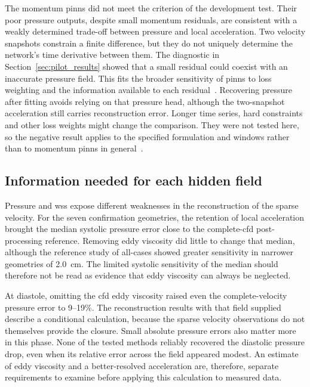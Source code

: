 \documentclass[12pt,a4paper]{article}
\newcommand{\CFD}{\ac{cfd}\xspace}
\newcommand{\PINNs}{\acp{pinn}\xspace}
\newcommand{\WSS}{\ac{wss}\xspace}
\theoremstyle{definition}
\numberwithin{equation}{section}
\begin{document}
The momentum \PINNs did not meet the criterion of the development test. Their poor pressure outputs, despite small momentum residuals, are consistent with a weakly determined trade-off between pressure and local acceleration. Two velocity snapshots constrain a finite difference, but they do not uniquely determine the network's time derivative between them. The diagnostic in Section~\ref{sec:pilot_results} showed that a small residual could coexist with an inaccurate pressure field. This fits the broader sensitivity of \PINNs to loss weighting and the information available to each residual~\cite{krishnapriyan2021failure,wang2021gradient}. Recovering pressure after fitting avoids relying on that pressure head, although the two-snapshot acceleration still carries reconstruction error. Longer time series, hard constraints and other loss weights might change the comparison. They were not tested here, so the negative result applies to the specified formulation and windows rather than to momentum \PINNs in general~\cite{mcgreivy2024weak}.

\subsection{Information needed for each hidden field}
Pressure and \WSS expose different weaknesses in the reconstruction of the sparse velocity. For the seven confirmation geometries, the retention of local acceleration brought the median systolic pressure error close to the complete-\CFD post-processing reference. Removing eddy viscosity did little to change that median, although the reference study of all-cases showed greater sensitivity in narrower geometries of 2.0~cm. The limited systolic sensitivity of the median should therefore not be read as evidence that eddy viscosity can always be neglected.

At diastole, omitting the \CFD eddy viscosity raised even the complete-velocity pressure error to 9--19\%. The reconstruction results with that field supplied describe a conditional calculation, because the sparse velocity observations do not themselves provide the closure. Small absolute pressure errors also matter more in this phase. None of the tested methods reliably recovered the diastolic pressure drop, even when its relative error across the field appeared modest. An estimate of eddy viscosity and a better-resolved acceleration are, therefore, separate requirements to examine before applying this calculation to measured data.
\end{document}
